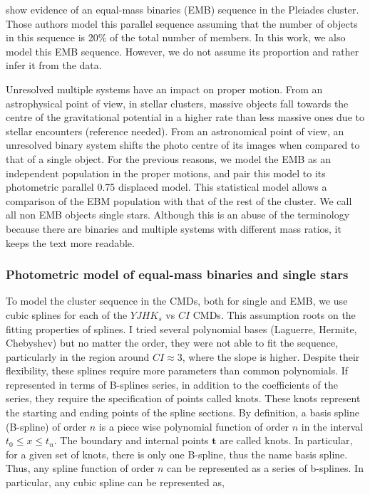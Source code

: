 \citet{Sarro2014} show evidence of an equal-mass binaries (EMB) sequence in the Pleiades cluster. Those authors model this parallel sequence assuming that the number of objects in this sequence is 20\% of the total number of members. In this work, we also model this EMB sequence. However, we do not assume its proportion and rather infer it from the data. 

Unresolved multiple systems have an impact on proper motion. From an astrophysical point of view, in stellar clusters, massive objects fall towards the centre of the gravitational potential in a higher rate than less massive ones due to stellar encounters (reference needed). From an astronomical point of view, an unresolved binary system shifts the photo centre of its images when compared to that of a single object. For the previous reasons, we model the EMB as an independent population in the proper motions, and pair this model to its photometric parallel 0.75 displaced model. This statistical model allows a comparison of the EBM population with that of the rest of the cluster. We call all non EMB objects single stars. Although this is an abuse of the terminology because there are binaries and multiple systems with different mass ratios, it keeps the text more readable.

\subsubsection{Photometric model of equal-mass binaries and single stars}

To model the cluster sequence in the CMDs, both for single and EMB, we use cubic splines for each of the $YJHK_s$ vs $CI$ CMDs. This assumption roots on the fitting properties of splines. I tried several polynomial bases (Laguerre, Hermite, Chebyshev) but no matter the order, they were not able to fit the sequence, particularly in the region around $CI \approx 3$, where the slope is higher. Despite their flexibility, these splines require more parameters than common polynomials. If represented in terms of B-splines series, in addition to the coefficients of the series, they require the specification of points called knots. These knots represent the starting and ending points of the spline sections. By definition, a basis spline (B-spline) of order $n$ is a piece wise polynomial function of order $n$ in the interval $t_0 \leq x \leq t_n$. The boundary and internal points $\mathbf{t}$ are called knots. In particular, for a given set of knots, there is only one B-spline, thus the name basis spline. Thus, any spline function of order $n$ can be represented as a series of b-splines. In particular, any cubic spline can be represented as,

